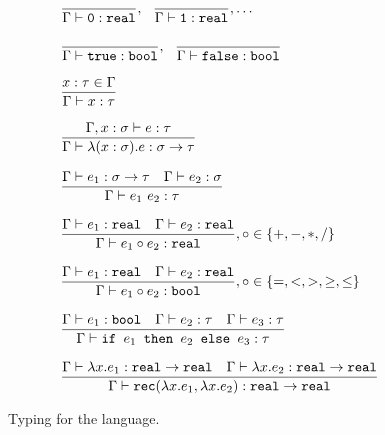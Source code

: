 \begin{figure}
\[
\begin{array}{lr}
\dfrac{}{\Gamma \vdash \texttt{0}: \texttt{real}}, \ \ \dfrac{}{\Gamma \vdash \texttt{1}: \texttt{real}}, \ldots \\ \\
\dfrac{}{\Gamma \vdash \texttt{true} : \texttt{bool}}, \ \ \dfrac{}{\Gamma \vdash \texttt{false} : \texttt{bool}} \\  \\
\dfrac{x : \tau \in \Gamma}{\Gamma \vdash x : \tau } \\ \\ 
\dfrac{\Gamma, x : \sigma \vdash e : \tau}{\Gamma \vdash \lambda (x : \sigma).e : \sigma \rightarrow \tau } \\ \\
\dfrac{\Gamma \vdash e_1: \sigma \rightarrow \tau \ \ \ \Gamma \vdash e_2 : \sigma}{\Gamma \vdash e_1 \ e_2 : \tau} \\ \\
\dfrac{\Gamma \vdash e_1 : \texttt{real} \ \ \ \Gamma \vdash e_2 : \texttt{real}}{\Gamma \vdash e_1 \circ e_2 : \texttt{real}}
, \circ \in \{+,-,*,/\} \\ \\ 
\dfrac{\Gamma \vdash e_1 : \texttt{real} \ \ \ \Gamma \vdash e_2 : \texttt{real}}{\Gamma \vdash e_1 \circ e_2 : \texttt{bool}}
, \circ \in \{=, <, >, \geq, \leq\} \\ \\ 
\dfrac{\Gamma \vdash e_1 : \texttt{bool} \ \ \ \Gamma \vdash e_2 : \tau \ \ \ \Gamma \vdash e_3 : \tau}
{\Gamma \vdash \ifelse{e_1}{e_2}{e_3} : \tau} \\ \\ 
\dfrac{\Gamma \vdash \lambda x.e_1 : \texttt{real} \rightarrow \texttt{real} \ \ \ \Gamma \vdash \lambda x.e_2 : 
\texttt{real} \rightarrow \texttt{real}}
{\Gamma \vdash \texttt{rec}(\lambda x.e_1, \lambda x.e_2) : \texttt{real} \rightarrow \texttt{real}} 
\end{array}
\]
\caption{Typing for the language.}
\label{fig:typing}
\end{figure}

